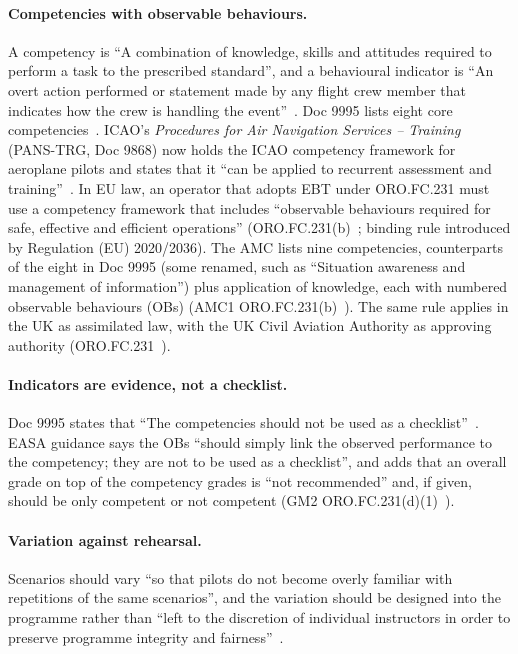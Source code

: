 \documentclass[11pt]{article}
\begin{document}
\paragraph{Competencies with observable behaviours.} A competency is ``A combination of knowledge, skills and attitudes required to perform a task to the prescribed standard'', and a behavioural indicator is ``An overt action performed or statement made by any flight crew member that indicates how the crew is handling the event''~\cite[Glossary]{icao2013ebt}. Doc 9995 lists eight core competencies~\cite[Part~II, Appendix~1]{icao2013ebt}. ICAO's \emph{Procedures for Air Navigation Services -- Training} (PANS-TRG, Doc 9868) now holds the ICAO competency framework for aeroplane pilots and states that it ``can be applied to recurrent assessment and training''~\cite[Part~II, Section~1, Chapter~1, 1.1.4]{icao2020panstrg}. In EU law, an operator that adopts EBT under ORO.FC.231 must use a competency framework that includes ``observable behaviours required for safe, effective and efficient operations'' (ORO.FC.231(b)~\cite{easa2026ear}; binding rule introduced by Regulation (EU) 2020/2036). The AMC lists nine competencies, counterparts of the eight in Doc 9995 (some renamed, such as ``Situation awareness and management of information'') plus application of knowledge, each with numbered observable behaviours (OBs) (AMC1 ORO.FC.231(b)~\cite{easa2026ear}). The same rule applies in the UK as assimilated law, with the UK Civil Aviation Authority as approving authority (ORO.FC.231~\cite{ukreg965}).

\paragraph{Indicators are evidence, not a checklist.} Doc 9995 states that ``The competencies should not be used as a checklist''~\cite[Part~I, 7.7.3]{icao2013ebt}. EASA guidance says the OBs ``should simply link the observed performance to the competency; they are not to be used as a checklist'', and adds that an overall grade on top of the competency grades is ``not recommended'' and, if given, should be only competent or not competent (GM2 ORO.FC.231(d)(1)~\cite{easa2026ear}).

\paragraph{Variation against rehearsal.} Scenarios should vary ``so that pilots do not become overly familiar with repetitions of the same scenarios'', and the variation should be designed into the programme rather than ``left to the discretion of individual instructors in order to preserve programme integrity and fairness''~\cite[Part~II, 1.7.1]{icao2013ebt}.
\end{document}
